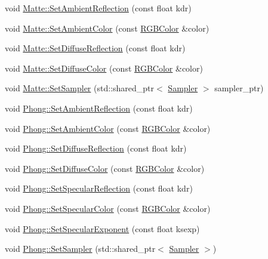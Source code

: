 \begin{DoxyCompactItemize}
\item 
void \hyperlink{group___materials_gad4df0e4b6f2112282b492f068faf1d72}{Matte\+::\+Set\+Ambient\+Reflection} (const float kdr)
\item 
void \hyperlink{group___materials_ga3a3fb682a6cfb419d05bf5dba9088f57}{Matte\+::\+Set\+Ambient\+Color} (const \hyperlink{class_r_g_b_color}{R\+G\+B\+Color} \&color)
\item 
void \hyperlink{group___materials_ga59c2ccdf9e80053784f5449603c7b7a3}{Matte\+::\+Set\+Diffuse\+Reflection} (const float kdr)
\item 
void \hyperlink{group___materials_ga6a82d5d8fd47aeb188380c067477e396}{Matte\+::\+Set\+Diffuse\+Color} (const \hyperlink{class_r_g_b_color}{R\+G\+B\+Color} \&color)
\item 
void \hyperlink{group___materials_ga6b42d7c8b02c61801702dc19d8e3ba5a}{Matte\+::\+Set\+Sampler} (std\+::shared\+\_\+ptr$<$ \hyperlink{class_sampler}{Sampler} $>$ sampler\+\_\+ptr)
\item 
void \hyperlink{group___materials_ga245b163a849cf378e84ed77620172f74}{Phong\+::\+Set\+Ambient\+Reflection} (const float kdr)
\item 
void \hyperlink{group___materials_ga7562b2e0139a3e2e93e61954d13c281f}{Phong\+::\+Set\+Ambient\+Color} (const \hyperlink{class_r_g_b_color}{R\+G\+B\+Color} \&color)
\item 
void \hyperlink{group___materials_ga7d9198210719a327b6c293955a9ecafe}{Phong\+::\+Set\+Diffuse\+Reflection} (const float kdr)
\item 
void \hyperlink{group___materials_ga54c0c1a1b40732588660aebbe01ce94f}{Phong\+::\+Set\+Diffuse\+Color} (const \hyperlink{class_r_g_b_color}{R\+G\+B\+Color} \&color)
\item 
void \hyperlink{group___materials_gaaa0823035fefb08e6f20e4af9c6f73d2}{Phong\+::\+Set\+Specular\+Reflection} (const float kdr)
\item 
void \hyperlink{group___materials_gaed8372d4e59cb7c1b781979c4ea9ee80}{Phong\+::\+Set\+Specular\+Color} (const \hyperlink{class_r_g_b_color}{R\+G\+B\+Color} \&color)
\item 
void \hyperlink{group___materials_ga167d70d514005d94a0bede7d7b12f372}{Phong\+::\+Set\+Specular\+Exponent} (const float ksexp)
\item 
void \hyperlink{group___materials_ga76b02c8e5a8dfff0a24c929b37a47c0c}{Phong\+::\+Set\+Sampler} (std\+::shared\+\_\+ptr$<$ \hyperlink{class_sampler}{Sampler} $>$)
\end{DoxyCompactItemize}



